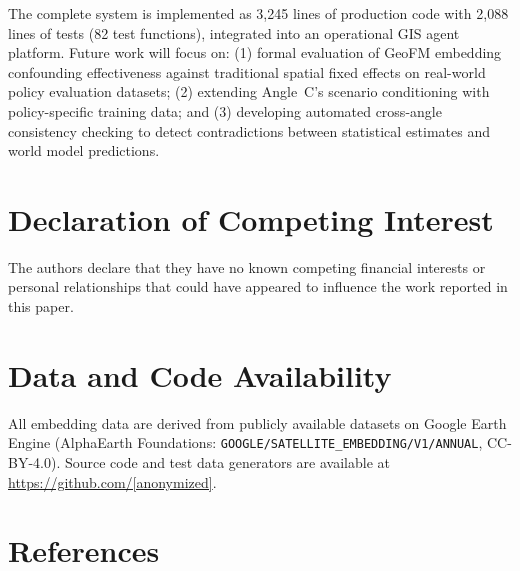 \documentclass{article}
\begin{document}
The complete system is implemented as 3{,}245 lines of production code with 2{,}088 lines of tests (82 test functions), integrated into an operational GIS agent platform. Future work will focus on: (1) formal evaluation of GeoFM embedding confounding effectiveness against traditional spatial fixed effects on real-world policy evaluation datasets; (2) extending Angle~C's scenario conditioning with policy-specific training data; and (3) developing automated cross-angle consistency checking to detect contradictions between statistical estimates and world model predictions.


\section*{Declaration of Competing Interest}
The authors declare that they have no known competing financial interests or personal relationships that could have appeared to influence the work reported in this paper.

\section*{Data and Code Availability}
All embedding data are derived from publicly available datasets on Google Earth Engine (AlphaEarth Foundations: \texttt{GOOGLE/SATELLITE\_EMBEDDING/V1/ANNUAL}, CC-BY-4.0). Source code and test data generators are available at \url{https://github.com/[anonymized]}.


\section*{References}
\end{document}
